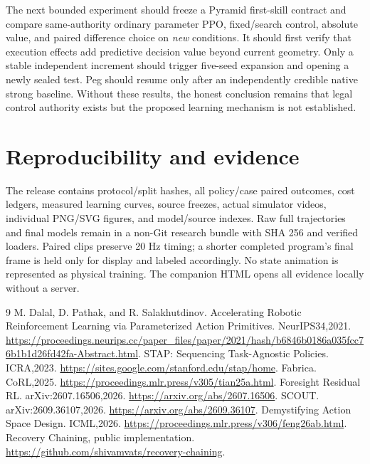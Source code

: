 \documentclass[10pt,a4paper,twocolumn]{article}
\begin{document}
The next bounded experiment should freeze a Pyramid first-skill contract and compare same-authority ordinary parameter PPO, fixed/search control, absolute value, and paired difference choice on \emph{new} conditions. It should first verify that execution effects add predictive decision value beyond current geometry. Only a stable independent increment should trigger five-seed expansion and opening a newly sealed test. Peg should resume only after an independently credible native strong baseline. Without these results, the honest conclusion remains that legal control authority exists but the proposed learning mechanism is not established.

\section{Reproducibility and evidence}
The release contains protocol/split hashes, all policy/case paired outcomes, cost ledgers, measured learning curves, source freezes, actual simulator videos, individual PNG/SVG figures, and model/source indexes. Raw full trajectories and final models remain in a non-Git research bundle with SHA 256 and verified loaders. Paired clips preserve 20 Hz timing; a shorter completed program's final frame is held only for display and labeled accordingly. No state animation is represented as physical training. The companion HTML opens all evidence locally without a server.

\begin{thebibliography}{9}\small
{} M. Dalal, D. Pathak, and R. Salakhutdinov. Accelerating Robotic Reinforcement Learning via Parameterized Action Primitives. NeurIPS34,2021. \url{https://proceedings.neurips.cc/paper_files/paper/2021/hash/b6846b0186a035fcc76b1b1d26fd42fa-Abstract.html}.
 STAP: Sequencing Task-Agnostic Policies. ICRA,2023. \url{https://sites.google.com/stanford.edu/stap/home}.
 Fabrica. CoRL,2025. \url{https://proceedings.mlr.press/v305/tian25a.html}.
 Foresight Residual RL. arXiv:2607.16506,2026. \url{https://arxiv.org/abs/2607.16506}.
 SCOUT. arXiv:2609.36107,2026. \url{https://arxiv.org/abs/2609.36107}.
 Demystifying Action Space Design. ICML,2026. \url{https://proceedings.mlr.press/v306/feng26ab.html}.
 Recovery Chaining, public implementation. \url{https://github.com/shivamvats/recovery-chaining}.
\end{thebibliography}
\end{document}
